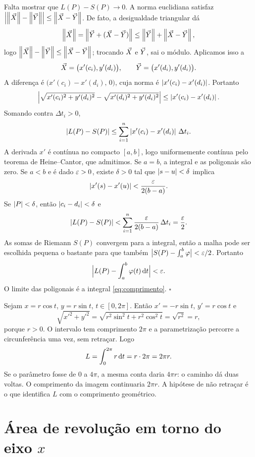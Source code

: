 \documentclass[11pt,a4paper]{article}
\begin{document}
Falta mostrar que \(L(P)-S(P)\to 0\). A norma euclidiana satisfaz \(\left\lvert \left\lVert \vec{X} \right\rVert-\left\lVert \vec{Y} \right\rVert \right\rvert\le\left\lVert \vec{X}-\vec{Y} \right\rVert\). De fato, a desigualdade triangular dá
\[
\left\lVert \vec{X} \right\rVert=\left\lVert \vec{Y}+(\vec{X}-\vec{Y}) \right\rVert\le\left\lVert \vec{Y} \right\rVert+\left\lVert \vec{X}-\vec{Y} \right\rVert,
\]
logo \(\left\lVert \vec{X} \right\rVert-\left\lVert \vec{Y} \right\rVert\le\left\lVert \vec{X}-\vec{Y} \right\rVert\); trocando \(\vec{X}\) e \(\vec{Y}\), sai o módulo. Aplicamos isso a
\[
\vec{X}=\bigl(x'(c_{i}),y'(d_{i})\bigr),
\qquad
\vec{Y}=\bigl(x'(d_{i}),y'(d_{i})\bigr).
\]
A diferença é \(\bigl(x'(c_{i})-x'(d_{i}),\,0\bigr)\), cuja norma é \(\left\lvert x'(c_{i})-x'(d_{i}) \right\rvert\). Portanto
\[
\Bigl\lvert\sqrt{x'(c_{i})^{2}+y'(d_{i})^{2}}-\sqrt{x'(d_{i})^{2}+y'(d_{i})^{2}}\Bigr\rvert
\le\left\lvert x'(c_{i})-x'(d_{i}) \right\rvert.
\]
Somando contra \(\Delta t_{i}>0\),
\[
\left\lvert L(P)-S(P) \right\rvert
\le\sum_{i=1}^{n}\left\lvert x'(c_{i})-x'(d_{i}) \right\rvert\,\Delta t_{i}.
\]
A derivada \(x'\) é contínua no compacto \([a,b]\), logo uniformemente contínua pelo teorema de Heine--Cantor, que admitimos. Se \(a=b\), a integral e as poligonais são zero. Se \(a<b\) e é dado \(\varepsilon>0\), existe \(\delta>0\) tal que \(\left\lvert s-u \right\rvert<\delta\) implica
\[
\left\lvert x'(s)-x'(u) \right\rvert<\frac{\varepsilon}{2(b-a)}.
\]
Se \(\left\lvert P \right\rvert<\delta\), então \(\left\lvert c_{i}-d_{i} \right\rvert<\delta\) e
\[
\left\lvert L(P)-S(P) \right\rvert
<\sum_{i=1}^{n}\frac{\varepsilon}{2(b-a)}\,\Delta t_{i}
=\frac{\varepsilon}{2}.
\]
As somas de Riemann \(S(P)\) convergem para a integral, então a malha pode ser escolhida pequena o bastante para que também \(\bigl\lvert S(P)-\int_{a}^{b}\varphi\bigr\rvert<\varepsilon/2\). Portanto
\[
\Bigl\lvert L(P)-\int_{a}^{b}\varphi(t)\,\mathrm{d} t\Bigr\rvert<\varepsilon.
\]
O limite das poligonais é a integral \eqref{eq:comprimento}.
\hfill\(\square\)

\begin{exemplo}
Sejam \(x=r\cos t\), \(y=r\sin t\), \(t\in[0,2\pi]\). Então \(x'=-r\sin t\), \(y'=r\cos t\) e
\[
\sqrt{x'^{2}+y'^{2}}
=\sqrt{r^{2}\sin^{2}t+r^{2}\cos^{2}t}
=\sqrt{r^{2}}=r,
\]
porque \(r>0\). O intervalo tem comprimento \(2\pi\) e a parametrização percorre a circunferência uma vez, sem retraçar. Logo
\[
L=\int_{0}^{2\pi} r\,\mathrm{d} t=r\cdot 2\pi=2\pi r.
\]
Se o parâmetro fosse de \(0\) a \(4\pi\), a mesma conta daria \(4\pi r\): o caminho dá duas voltas. O comprimento da imagem continuaria \(2\pi r\). A hipótese de não retraçar é o que identifica \(L\) com o comprimento geométrico.
\end{exemplo}

\section{Área de revolução em torno do eixo \(x\)}
\end{document}

